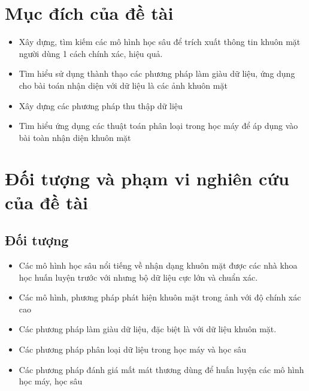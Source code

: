 
\section{Mục đích của đề tài}

\begin{itemize}
    \item Xây dựng, tìm kiếm các mô hình học sâu để trích xuất thông tin khuôn mặt
          người dùng 1 cách chính xác, hiệu quả.
    \item Tìm hiểu sử dụng thành thạo các phương pháp làm giàu dữ liệu,
          ứng dụng cho bài toán nhận diện với dữ liệu là các ảnh khuôn mặt
    \item Xây dựng các phương pháp thu thập dữ liệu
    \item Tìm hiểu ứng dụng các thuật toán phân loại trong học máy để
          áp dụng vào bài toàn nhận diện khuôn mặt
\end{itemize}

\section{Đối tượng và phạm vi nghiên cứu của đề tài}
\subsection{Đối tượng}
\begin{itemize}
    \item Các mô hình học sâu nổi tiếng về nhận dạng khuôn mặt được các nhà khoa học huấn luyện trước với nhưng bộ dữ liệu
          cực lớn và chuẩn xác.
    \item Các mô hình, phương pháp phát hiện khuôn mặt trong ảnh với độ chính xác cao
    \item Các phương pháp làm giàu dữ liệu, đặc biệt là với dữ liệu khuôn mặt.
    \item Các phương pháp phân loại dữ liệu trong học máy và học sâu
    \item Các phương pháp đánh giá mất mát thương dùng để huấn luyện các mô hình học máy, học sâu
\end{itemize}

